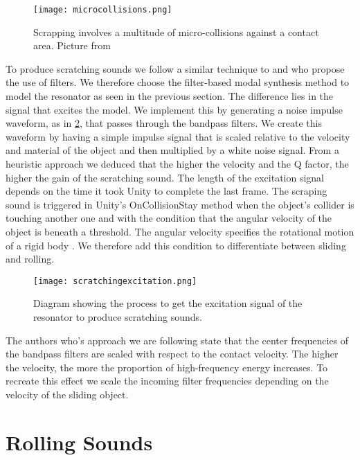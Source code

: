 \begin{figure}[H]
  \centering
    \texttt{[image: microcollisions.png]}
      \caption{Scrapping involves a multitude of micro-collisions against a contact area. Picture from \cite{gaver1993we}}
      \label{fig:microcollisions}
\end{figure}

To produce scratching sounds we follow a similar technique to \cite{gaver1993we} and \cite{van2001foleyautomatic} who propose the use of filters. We therefore choose the filter-based modal synthesis method to model the resonator as seen in the previous section. The difference lies in the signal that excites the model. We implement this by generating a noise impulse waveform, as in \ref{fig:scratchingimpulse}, that passes through the bandpass filters. We create this waveform by having a simple impulse signal that is scaled relative to the velocity and material of the object and then multiplied by a white noise signal. From a heuristic approach we deduced that the higher the velocity and the Q factor, the higher the gain of the scratching sound. The length of the excitation signal depends on the time it took Unity to complete the last frame. The scraping sound is triggered in Unity's OnCollisionStay method when the object's collider is touching another one and with the condition that the angular velocity of the object is beneath a threshold. The angular velocity specifies the rotational motion of a rigid body \cite{sears1964university}. We therefore add this condition to differentiate between sliding and rolling.

\begin{figure}[H]
  \centering
    \texttt{[image: scratchingexcitation.png]}
      \caption{Diagram showing the process to get the excitation signal of the resonator to produce scratching sounds.}
      \label{fig:scratchingimpulse}
\end{figure} 

The authors who's approach we are following state that the center frequencies of the bandpass filters are scaled with respect to the contact velocity. The higher the velocity, the more the proportion of high-frequency energy increases. To recreate this effect we scale the incoming filter frequencies depending on the velocity of the sliding object.

\section{Rolling Sounds}

